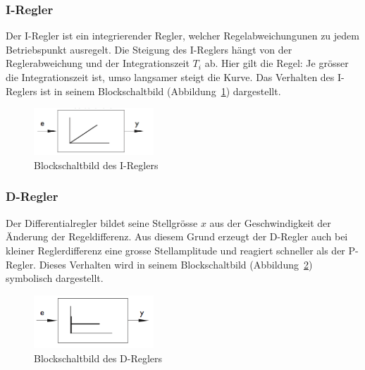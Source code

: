 \subsubsection*{I-Regler}
Der  I-Regler  ist  ein  integrierender  Regler,  welcher  Regelabweichungunen
zu  jedem   Betriebspunkt  ausregelt. Die   Steigung  des   I-Reglers  h\"angt
von  der  Reglerabweichung  und   der  Integrationszeit  $T_i$  ab. Hier  gilt
die  Regel: Je  gr\"osser  die  Integrationszeit ist,  umso  langsamer  steigt
die  Kurve. Das   Verhalten  des  I-Reglers  ist   in  seinem  Blockschaltbild
(Abbildung~\ref{fig:IRegler}) dargestellt.

\begin{figure}[h!, width=\pagewidth]
    \centering
    \includegraphics[width=0.4\textwidth]{images/IRegler}
    \caption{Blockschaltbild des I-Reglers}
    \label{fig:IRegler}
\end{figure}

\subsubsection*{D-Regler}
Der Differentialregler bildet seine  Stellgr\"osse $x$ aus der Geschwindigkeit
der  \"Anderung  der Regeldifferenz. Aus  diesem  Grund  erzeugt der  D-Regler
auch  bei  kleiner Reglerdifferenz  eine  grosse  Stellamplitude und  reagiert
schneller als  der P-Regler. Dieses  Verhalten wird in  seinem Blockschaltbild
(Abbildung~\ref{fig:DRegler}) symbolisch dargestellt.

\begin{figure}[h!, width=\pagewidth]
    \centering
    \includegraphics[width=0.4\textwidth]{images/DRegler}
    \caption{Blockschaltbild des D-Reglers}
    \label{fig:DRegler}
\end{figure}


